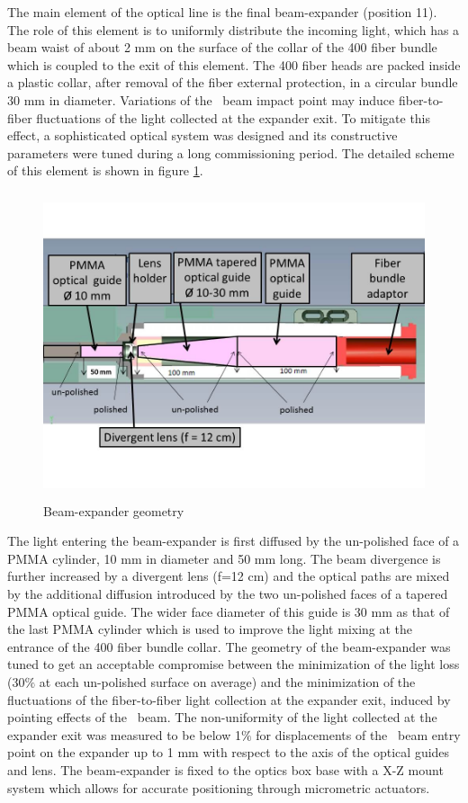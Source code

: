The main element of the optical line is the final beam-expander (position 11). The
role of this element is to uniformly distribute the incoming light, which has a
beam waist of about 2 mm on the surface of the collar of the 400 fiber bundle which
is coupled to the exit of this element. The 400 fiber heads are packed inside a
plastic collar, after removal of the fiber external protection, in a circular bundle
30 mm in diameter. Variations of the \laser~beam impact point may induce fiber-to-fiber fluctuations of the light collected at the expander exit. To mitigate this effect, a sophisticated optical system was designed and its constructive parameters were tuned
during a long commissioning period.  The detailed scheme of this element is shown in
figure \ref{fig:x.4}.
% 
\begin{figure}[htb]
\begin{center} 
\includegraphics[width=13cm, height=9cm]{figures/Beam_expander}
\caption{Beam-expander geometry
}\label{fig:x.4}
\end{center}
\end{figure}
%

The light entering the beam-expander is first diffused by the un-polished face of a
PMMA cylinder, 10 mm in diameter and 50 mm long. The beam divergence is further
increased by a divergent lens (f=12 cm) and the optical paths are mixed by the
additional diffusion introduced by the two un-polished faces of a tapered PMMA
optical guide. The wider face diameter of this guide is 30 mm as that of the last
PMMA cylinder which is used to improve the light mixing at
the entrance of the 400 fiber bundle collar. The geometry of the beam-expander was
tuned to get an acceptable compromise between the minimization
of the light loss (30$\%$ at each un-polished surface on average) and the
minimization of the fluctuations of the fiber-to-fiber light collection at the
expander exit, induced by pointing effects of the \laser~beam. The non-uniformity of
the light collected at the expander exit was measured to be below 1$\%$ for
displacements of the \laser~beam entry point on the expander up to 1 mm with respect
to the axis of the optical guides and lens. The beam-expander is fixed to the optics
box base with a X-Z mount system which allows for accurate positioning through
micrometric actuators.

